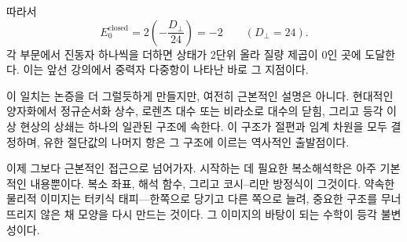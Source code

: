 따라서
\begin{equation}
  E_0^{\mathrm{closed}}
  =
  2\left(-\frac{D_\perp}{24}\right)
  =-2
  \qquad (D_\perp=24).
\end{equation}
각 부문에서 진동자 하나씩을 더하면 상태가 2단위 올라 질량 제곱이 0인 곳에 도달한다. 이는 앞선 강의에서 중력자 다중항이 나타난 바로 그 지점이다.

이 일치는 논증을 더 그럴듯하게 만들지만, 여전히 근본적인 설명은 아니다. 현대적인 양자화에서 정규순서화 상수, 로렌츠 대수 또는 비라소로 대수의 닫힘, 그리고 등각 이상 현상의 상쇄는 하나의 일관된 구조에 속한다. 이 구조가 절편과 임계 차원을 모두 결정하며, 유한 절단값의 나머지 항은 그 구조에 이르는 역사적인 출발점이다.

이제 그보다 근본적인 접근으로 넘어가자. 시작하는 데 필요한 복소해석학은 아주 기본적인 내용뿐이다. 복소 좌표, 해석 함수, 그리고 코시--리만 방정식이 그것이다. 약속한 물리적 이미지는 터키식 태피---한쪽으로 당기고 다른 쪽으로 늘려, 중요한 구조를 무너뜨리지 않은 채 모양을 다시 만드는 것이다. 그 이미지의 바탕이 되는 수학이 등각 불변성이다.